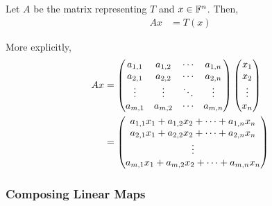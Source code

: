\begin{definition}
    Let $A$ be the matrix representing $T$ and $x \in \mathbb{F}^n$. Then,
    \begin{align*}
        Ax &= T(x)
    \end{align*}

    More explicitly,
    \begin{align*}
        Ax &= 
        \begin{pmatrix}
            a_{1, 1} & a_{1, 2} & \cdots & a_{1, n} \\
            a_{2, 1} & a_{2, 2} & \cdots & a_{2, n} \\
            \vdots & \vdots & \ddots & \vdots \\
            a_{m, 1} & a_{m, 2} & \cdots & a_{m, n}
        \end{pmatrix}
        \begin{pmatrix} x_1 \\ x_2 \\ \vdots \\ x_n \end{pmatrix}
        \\ &=
        \begin{pmatrix}
            a_{1, 1} x_1 + a_{1, 2} x_2 + \cdots + a_{1, n} x_n \\
            a_{2, 1} x_1 + a_{2, 2} x_2 + \cdots + a_{2, n} x_n \\
            \vdots \\
            a_{m, 1} x_1 + a_{m, 2} x_2 + \cdots + a_{m, n} x_n
        \end{pmatrix}
    \end{align*}

\end{definition}

\subsubsection{Composing Linear Maps}

